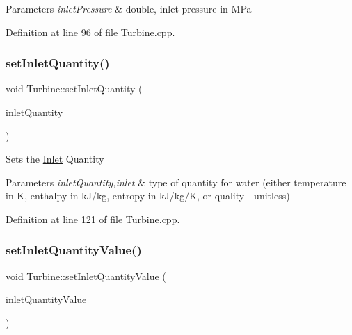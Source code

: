 \begin{DoxyParams}{Parameters}
{\em inlet\+Pressure} & double, inlet pressure in M\+Pa \\
\hline
\end{DoxyParams}


Definition at line 96 of file Turbine.\+cpp.

\mbox{\label{class_turbine_aecc05c70870fb11bbc0bb4fe5d8438bd}} 
\subsubsection{\texorpdfstring{set\+Inlet\+Quantity()}{setInletQuantity()}}
{\footnotesize\ttfamily void Turbine\+::set\+Inlet\+Quantity (\begin{DoxyParamCaption}\item[{\hyperlink{class_steam_properties_ae0294bedf7d178c2d8fb6aed0f62fbff}{Steam\+Properties\+::\+Thermodynamic\+Quantity}}]{inlet\+Quantity }\end{DoxyParamCaption})}

Sets the \hyperlink{class_inlet}{Inlet} Quantity


\begin{DoxyParams}{Parameters}
{\em inlet\+Quantity,inlet} & type of quantity for water (either temperature in K, enthalpy in k\+J/kg, entropy in k\+J/kg/K, or quality -\/ unitless) \\
\hline
\end{DoxyParams}


Definition at line 121 of file Turbine.\+cpp.

\mbox{\label{class_turbine_ac01a053462c83e21ecc2158e75477542}} 
\subsubsection{\texorpdfstring{set\+Inlet\+Quantity\+Value()}{setInletQuantityValue()}}
{\footnotesize\ttfamily void Turbine\+::set\+Inlet\+Quantity\+Value (\begin{DoxyParamCaption}\item[{double}]{inlet\+Quantity\+Value }\end{DoxyParamCaption})}

